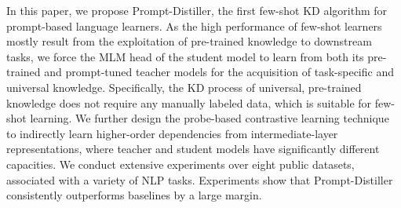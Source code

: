 \documentclass{article}
\begin{document}


In this paper, we propose Prompt-Distiller, the first few-shot KD algorithm for prompt-based language learners. As the high performance of few-shot learners mostly result from the exploitation of pre-trained knowledge to downstream tasks, we force the MLM head of the student model to learn from both its pre-trained and prompt-tuned teacher models for the acquisition of task-specific and universal knowledge.
Specifically, the KD process of universal, pre-trained knowledge does not require any manually labeled data, which is suitable for few-shot learning.
We further design the probe-based contrastive learning technique to indirectly learn higher-order dependencies from intermediate-layer representations, where teacher and student models have significantly different capacities.
We conduct extensive experiments over eight public datasets, associated with a variety of NLP tasks.
Experiments show that Prompt-Distiller consistently outperforms baselines by a large margin.
\end{document}
